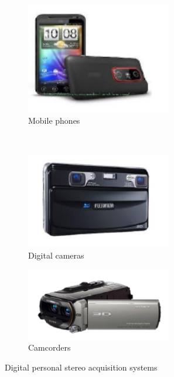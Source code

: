 \begin{figure}[h!]
\centering
\begin{subfigure}[]{0.4\textwidth}
\centering
\includegraphics[width=0.7\textwidth]{./img/devices1.png}
\caption{\scriptsize{Mobile phones}}
\end{subfigure}%
~ %
\begin{subfigure}[]{0.25\textwidth}
\centering
\includegraphics[width=0.7\textwidth]{./img/devices2.png}
\caption{\scriptsize{Digital cameras}}
\end{subfigure} 
\begin{subfigure}[]{0.4\textwidth}
\centering
\includegraphics[width=0.7\textwidth]{./img/devices3.png}
\caption{\scriptsize{Camcorders}}
\end{subfigure}%
\caption{\small{Digital personal stereo acquisition systems}}\label{fig:mobile}
\end{figure}
